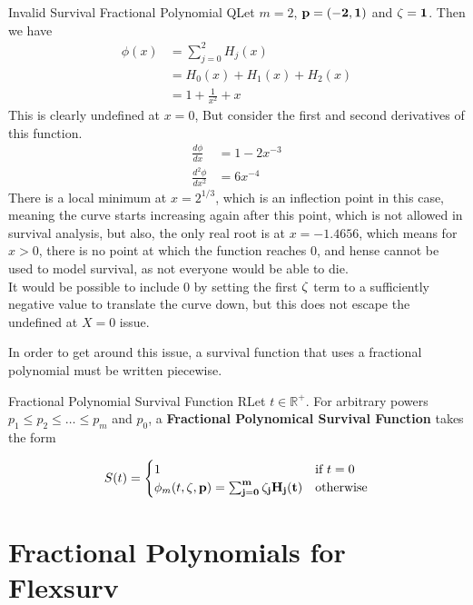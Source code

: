\begin{example}{Invalid Survival Fractional Polynomial}
    QLet $m = 2$, $\bf{p} = (-2, 1)$ and $\bf{\zeta} = \bf{1}$. Then we have 
    \begin{align*}
        \phi(x) &= \sum_{j=0}^{2}H_j(x) \\
                &= H_0(x) + H_1(x) + H_2(x) \\
                &= 1 + \frac{1}{x^2} + x 
    \end{align*}
    This is clearly undefined at $x = 0$, But consider the first and second derivatives of this function. 
    \begin{align*}
        \frac{d \phi}{dx} &= 1 - 2x^{-3} \\
        \frac{d^2 \phi}{dx^2} &= 6x^{-4}
    \end{align*}
    There is a local minimum at $x = 2^{1/3}$, which is an inflection point in this case, meaning the curve starts increasing again after this point, which is not allowed in survival analysis, but also, the only real root is at $x = -1.4656$, which means for $x > 0$, there is no point at which the function reaches 0, and hense cannot be used to model survival, as not everyone would be able to die.\\

    It would be possible to include 0 by setting the first $\bf{\zeta}$ term to a sufficiently negative value to translate the curve down, but this does not escape the undefined at $X = 0$ issue.
\end{example}

In order to get around this issue, a survival function that uses a fractional polynomial must be written piecewise. 

\begin{definition}{Fractional Polynomial Survival Function}
    RLet $t \in \mathbb{R^+}$. For arbitrary powers $p_1 \leq p_2 \leq \ldots \leq p_m$ and $p_0$, a \textbf{Fractional Polynomical Survival Function} takes the form 

    \[
        S(t) = \begin{cases}
            1 & \text{if } t = 0 \\
            \phi_m(t, \bf{\zeta}, \bf{p}) = \sum_{j = 0}^{m} \zeta_j H_j(t) & \text{otherwise}
        \end{cases}  
    \]
\end{definition}

\section{Fractional Polynomials for Flexsurv}
